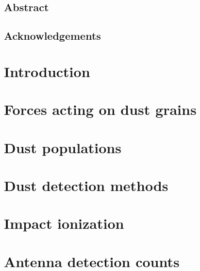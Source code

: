 \documentclass[11pt,twoside,openright]{book}
\begin{document}
\frontmatter


\newpage\null\thispagestyle{empty}\newpage

\setcounter{page}{1}\thispagestyle{empty}\newpage

\section*{Abstract}


\newpage\null\newpage
\section*{Acknowledgements}

\newpage\null\newpage

\tableofcontents

\mainmatter

\chapter{Introduction}


\chapter{Forces acting on dust grains}


\chapter{Dust populations}


\chapter{Dust detection methods}


\chapter{Impact ionization}


\chapter{Antenna detection counts}

\end{document}
